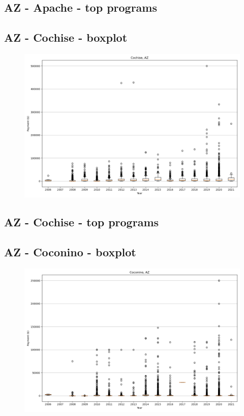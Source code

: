 \subsection*{AZ - Apache - top programs}

\newpage
\subsection*{AZ - Cochise - boxplot}
\begin{figure}[h]
\centering
\includegraphics[width=7in]{../output/boxplots/counties/Cochise-AZ_boxplot.png}
\end{figure}


\subsection*{AZ - Cochise - top programs}

\newpage
\subsection*{AZ - Coconino - boxplot}
\begin{figure}[h]
\centering
\includegraphics[width=7in]{../output/boxplots/counties/Coconino-AZ_boxplot.png}
\end{figure}


